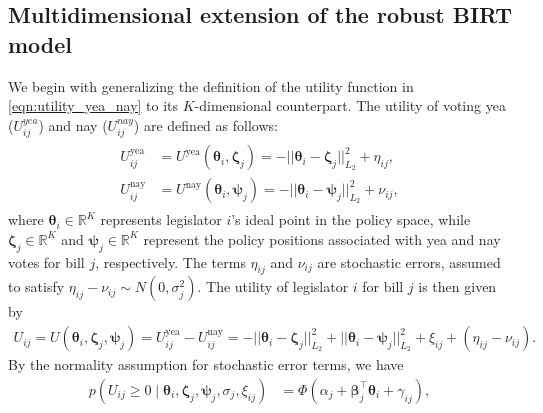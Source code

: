 \documentclass[11pt]{article}
\begin{document}
\subsection{Multidimensional extension of the robust BIRT model}\label{sub_sec_7.1}
We begin with generalizing the definition of the utility function in \eqref{eqn:utility_yea_nay} to its $K$-dimensional counterpart. The utility of voting yea ($U_{ij}^{yea}$) and nay ($U_{ij}^{nay}$) are defined as follows:
\begin{align*}
\begin{split}
    U_{ij}^{\text{yea}} &= U^{\text{yea}}(\boldsymbol{\theta}_i, \boldsymbol{\zeta}_j) = -||\boldsymbol{\theta}_i - \boldsymbol{\zeta}_j||_{L_2}^2 + \eta_{ij},\\
    U_{ij}^{\text{nay}} &= U^{\text{nay}}(\boldsymbol{\theta}_i, \boldsymbol{\psi}_j) = -||\boldsymbol{\theta}_i - \boldsymbol{\psi}_j||_{L_2}^2 + \nu_{ij},
\end{split}
\end{align*}  
where $ \boldsymbol{\theta}_i \in \mathbb{R}^K $ represents legislator $ i $'s ideal point in the policy space, while $ \boldsymbol{\zeta}_j \in \mathbb{R}^K$ and $ \boldsymbol{\psi}_j \in \mathbb{R}^K$ represent the policy positions associated with yea and nay votes for bill $ j $, respectively. The terms $ \eta_{ij} $ and $ \nu_{ij} $ are stochastic errors, assumed to satisfy $ \eta_{ij} - \nu_{ij} \sim N(0, \sigma_j^2) $.   
The utility of legislator $i$ for bill $j$ is then given by  
\begin{align*}
    U_{ij} = U(\boldsymbol{\theta}_i, \boldsymbol{\zeta}_j, \boldsymbol{\psi}_j)  = U_{ij}^{\text{yea}} - U_{ij}^{\text{nay}} = -||\boldsymbol{\theta}_i - \boldsymbol{\zeta}_j||_{L_2}^2 + ||\boldsymbol{\theta}_i - \boldsymbol{\psi}_j||_{L_2}^2 + \xi_{ij} + (\eta_{ij} - \nu_{ij}).
\end{align*}  
By the normality assumption for stochastic error terms, we have
\begin{align*}
    p(U_{ij} \geq 0 \mid \boldsymbol{\theta}_i, \boldsymbol{\zeta}_j, \boldsymbol{\psi}_j, \sigma_j, \xi_{ij}) 
    &= \Phi(\alpha_j + \boldsymbol{\beta}_j^\top \boldsymbol{\theta}_i + \gamma_{ij}),
\end{align*}  
\end{document}
